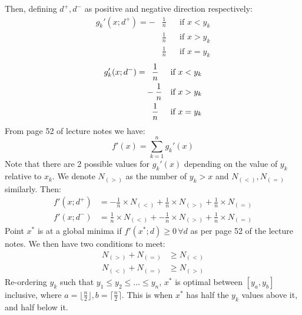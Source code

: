 \documentclass[10pt,a4paper]{article}
\begin{document}
\begin{enumerate}
	Then, defining \(d^+, d^-\) as positive and negative direction respectively: 
	\begin{align*}
	g_k'(x; d^+) = -&\frac{1}{n} && \text{if } x < y_k \\
	& \frac{1}{n} && \text{if } x > y_k \\
	& \frac{1}{n} && \text{if } x = y_k
	\end{align*}
	\begin{align*}
	g_k'(x; d^-) = &\hphantom{-}\frac{1}{n} && \text{if } x < y_k \\
	& -\frac{1}{n} && \text{if } x > y_k \\
	& \hphantom{-}\frac{1}{n} && \text{if } x = y_k
	\end{align*}
	From page 52 of lecture notes we have: 
	\begin{equation*}
	f'(x) = \sum_{k=1}^{n} g_k'(x)
	\end{equation*}
	Note that there are 2 possible values for \(g_k'(x)\) depending on the value of \(y_k\) relative to \(x_k\). We denote \(N_{(>)}\) as the number of \(y_k > x\) and \(N_{(<)}, N_{(=)}\) similarly. Then: 
	\begin{align*}
	f'(x; d^+) &= -\frac{1}{n} \times N_{(<)} + \frac{1}{n} \times N_{(>)} + \frac{1}{n} \times N_{(=)} \\
	f'(x; d^-) &= \frac{1}{n} \times N_{(<)} + -\frac{1}{n} \times N_{(>)} + \frac{1}{n} \times N_{(=)}
	\end{align*}
	Point \(x^*\) is at a global minima if \(f'(x^*; d) \geq 0 \, \forall d\) as per page 52 of the lecture notes. We then have two conditions to meet: 
	\begin{align*}
	N_{(>)} + N_{(=)} &\geq N_{(<)} \\
	N_{(<)} + N_{(=)} &\geq N_{(>)}
	\end{align*}
	Re-ordering \(y_k\) such that \(y_1 \leq y_2 \leq \dots \leq y_n\), \(x^*\) is optimal between \([y_a, y_b]\) inclusive, where \(a = \lfloor\frac{n}{2}\rfloor, b = \lceil\frac{n}{2}\rceil\). This is when \(x^*\) has half the \(y_k\) values above it, and half below it.
	
\end{enumerate}

	
\end{document}
